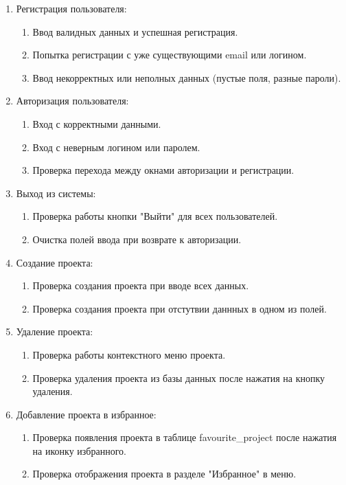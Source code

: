 \begin{enumerate}
\item Регистрация пользователя:
    \begin{enumerate}
     \item  Ввод валидных данных и успешная регистрация.
     
     \item Попытка регистрации с уже существующими email или логином.
     
     \item Ввод некорректных или неполных данных (пустые поля, разные
пароли).
    \end{enumerate}

\item Авторизация пользователя:
    \begin{enumerate}
         \item Вход с корректными данными.
         \item Вход с неверным логином или паролем.
         \item Проверка перехода между окнами авторизации и регистрации.
    \end{enumerate}

\item Выход из системы:
    \begin{enumerate}
        \item Проверка работы кнопки "Выйти" для всех пользователей.
        \item Очистка полей ввода при возврате к авторизации.
    \end{enumerate}

\item Создание проекта:
    \begin{enumerate}
        \item Проверка создания проекта при вводе всех данных.
        \item Проверка создания проекта при отстутвии даннных в одном из полей.
    \end{enumerate}

 \item Удаление проекта:
    \begin{enumerate}
        \item Проверка работы контекстного меню проекта.
        \item Проверка удаления проекта из базы данных после нажатия на кнопку удаления.
    \end{enumerate}

 \item Добавление проекта в избранное:
    \begin{enumerate}
        \item Проверка появления проекта в таблице favourite\_project после нажатия на иконку избранного.
        \item Проверка отображения проекта в разделе "Избранное" в меню.
    \end{enumerate}



\end{enumerate}
